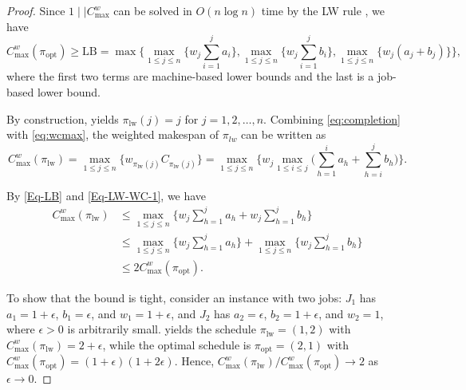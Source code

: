 \documentclass[12pt]{article} \textheight=24.5cm \textwidth=16.5cm \parskip = 0.165cm
\begin{document}
\begin{sloppypar}
        \begin{proof}
            Since $1 \mid \mid C_{\max}^w$ can be solved in $O(n\log n)$ time by the LW rule \citep{NongChengNg2011EJOR}, we have
            \begin{equation}\label{Eq-LB}
                C_{\max}^w(\pi_{\mathrm{opt}}) \geq \mathrm{LB}=\max \Big \{\max_{1 \leq j \leq n} \Big\{w_j \sum_{i=1}^j a_i \Big\}, \max_{1 \leq j \leq n} \Big\{w_j \sum_{i=1}^j b_i\Big\}, \max_{1 \leq j \leq n} \Big\{w_j (a_j+b_j)\Big\} \Big\},
            \end{equation}
            where the first two terms are machine-based lower bounds and the last is a job-based lower bound.   
            
            By construction,  yields $\pi_{\mathrm{lw}}(j)=j$ for $j=1, 2, \ldots, n$. Combining \cref{eq:completion} with  \cref{eq:wcmax}, the weighted makespan of $\pi_{lw}$ can be written as 
            \begin{equation}\label{Eq-LW-WC-1}
                C_{\max}^w(\pi_{\mathrm{lw}}) =\max_{1 \leq j \leq n}\Big\{ w_{\pi_{\mathrm{lw}}(j)} C_{\pi_{\mathrm{lw}}(j)}\Big\}=\max_{1 \leq j \leq n} \Big\{w_j \max_{1 \leq i \leq j} \Big (\sum_{h=1}^{i}a_h + \sum_{h=i}^{j}b_h \Big) \Big\}.
            \end{equation}
            
            By \cref{Eq-LB} and \cref{Eq-LW-WC-1}, we have 
            \begin{equation}\label{Eq-LW-WC-2}
                \begin{aligned}
                    C_{\max}^w(\pi_{\mathrm{lw}}) & \leq \max_{1 \leq j \leq n} \Big\{w_j \sum_{h=1}^{j}a_h + w_j \sum_{h=1}^{j}b_h \Big\} \\
                    & \leq \max_{1 \leq j \leq n} \Big\{w_j \sum_{h=1}^{j}a_h \Big\}+\max_{1 \leq j \leq n} \Big\{w_j \sum_{h=1}^{j}b_h \Big\} \\
                    & \leq 2 C_{\max}^w(\pi_{\mathrm{opt}}).
                \end{aligned}
            \end{equation}
            
            To show that the bound is tight, consider an instance with two jobs: $J_1$ has  $a_1=1+\epsilon$, $b_1=\epsilon$, and $w_1= 1+\epsilon$, and $J_2$ has $a_2=\epsilon$, $b_2=1+\epsilon$, and $w_2= 1$, where $\epsilon > 0$ is arbitrarily small.  yields the schedule $\pi_{\mathrm{lw}}=(1,2)$ with $C_{\max}^w(\pi_{\mathrm{lw}})=2+\epsilon$, while the optimal schedule is $\pi_{\mathrm{opt}}=(2,1)$ with $C_{\max}^w(\pi_{\mathrm{opt}})=(1+\epsilon)(1+2\epsilon)$. Hence, $C_{\max}^w(\pi_{\mathrm{lw}})/C_{\max}^w(\pi_{\mathrm{opt}}) \to 2$ as $\epsilon \to 0$.
        \end{proof}
        

\end{sloppypar}
\end{document}
